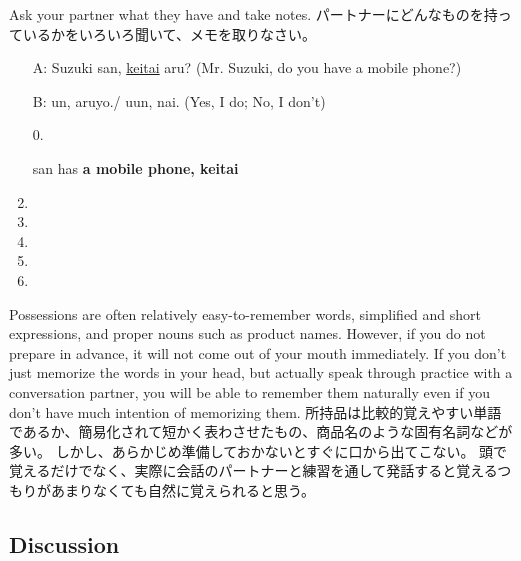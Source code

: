 \documentclass[uplatex,dvipdfmx,b5paper,english,10pt]{jsbook}
\begin{document}
\begin{toiquestion}
\ifEnglish
Ask your partner what they have and take notes.
\else
パートナーにどんなものを持っているかをいろいろ聞いて、メモを取りなさい。
\fi
\end{toiquestion}

\begin{itemize}
\item[A:] Suzuki san, \underline{keitai} aru? (Mr. Suzuki, do you have a mobile phone?)
\item[B:] un, aruyo./ uun, nai. (Yes, I do; No, I don't)
\end{itemize}

\setlength{\columnsep}{-10pt}
\begin{enumerate}
 \item[0.] \hrulefill\par
	   \vspace{-1.2\baselineskip}\hspace{.5em}{\bfseries Suzuki} san has {\bfseries a mobile phone, keitai}
	   \vspace{.2\baselineskip}
 \item \hrulefill
 \item \hrulefill
 \item \hrulefill
 \item \hrulefill
 \item \hrulefill
\end{enumerate}

\begin{toianswer}
\ifEnglish
Possessions are often relatively easy-to-remember words, simplified and short expressions, and proper nouns such as product names.
However, if you do not prepare in advance, it will not come out of your mouth immediately.
If you don't just memorize the words in your head, but actually speak through practice with a conversation partner, you will be able to remember them naturally even if you don't have much intention of memorizing them.
\else
所持品は比較的覚えやすい単語であるか、簡易化されて短かく表わさせたもの、商品名のような固有名詞などが多い。
しかし、あらかじめ準備しておかないとすぐに口から出てこない。
頭で覚えるだけでなく、実際に会話のパートナーと練習を通して発話すると覚えるつもりがあまりなくても自然に覚えられると思う。
\fi
\end{toianswer}

\ifEnglish
\subsection{Discussion}
\else
\end{document}
